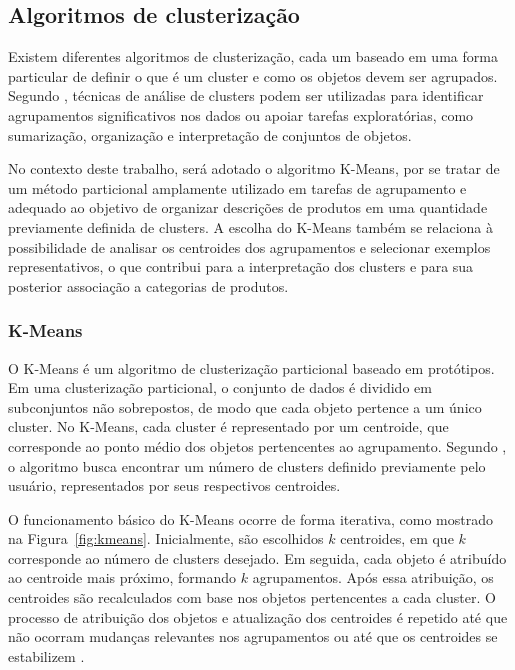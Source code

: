 \documentclass[english,brazilian]{UNISINOSmonografia}
\begin{document}
\subsection{Algoritmos de clusterização}

Existem diferentes algoritmos de clusterização, cada um baseado em uma forma particular de definir o que é um cluster e como os objetos devem ser agrupados. Segundo \cite{tan2005introduction}, técnicas de análise de clusters podem ser utilizadas para identificar agrupamentos significativos nos dados ou apoiar tarefas exploratórias, como sumarização, organização e interpretação de conjuntos de objetos.

No contexto deste trabalho, será adotado o algoritmo K-Means, por se tratar de um método particional amplamente utilizado em tarefas de agrupamento e adequado ao objetivo de organizar descrições de produtos em uma quantidade previamente definida de clusters. A escolha do K-Means também se relaciona à possibilidade de analisar os centroides dos agrupamentos e selecionar exemplos representativos, o que contribui para a interpretação dos clusters e para sua posterior associação a categorias de produtos.

\subsubsection{K-Means}

O K-Means é um algoritmo de clusterização particional baseado em protótipos. Em uma clusterização particional, o conjunto de dados é dividido em subconjuntos não sobrepostos, de modo que cada objeto pertence a um único cluster. No K-Means, cada cluster é representado por um centroide, que corresponde ao ponto médio dos objetos pertencentes ao agrupamento. Segundo \cite{tan2005introduction}, o algoritmo busca encontrar um número de clusters definido previamente pelo usuário, representados por seus respectivos centroides.

O funcionamento básico do K-Means ocorre de forma iterativa, como mostrado na Figura~\ref{fig:kmeans}. Inicialmente, são escolhidos $k$ centroides, em que $k$ corresponde ao número de clusters desejado. Em seguida, cada objeto é atribuído ao centroide mais próximo, formando $k$ agrupamentos. Após essa atribuição, os centroides são recalculados com base nos objetos pertencentes a cada cluster. O processo de atribuição dos objetos e atualização dos centroides é repetido até que não ocorram mudanças relevantes nos agrupamentos ou até que os centroides se estabilizem \cite{tan2005introduction}.
\end{document}
